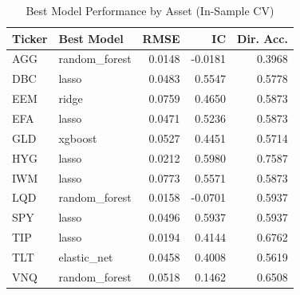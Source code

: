 \begin{table}
\caption{Best Model Performance by Asset (In-Sample CV)}
\label{tab:per_asset}
\begin{tabular}{llrrr}
\toprule
Ticker & Best Model & RMSE & IC & Dir. Acc. \\
\midrule
AGG & random_forest & 0.0148 & -0.0181 & 0.3968 \\
DBC & lasso & 0.0483 & 0.5547 & 0.5778 \\
EEM & ridge & 0.0759 & 0.4650 & 0.5873 \\
EFA & lasso & 0.0471 & 0.5236 & 0.5873 \\
GLD & xgboost & 0.0527 & 0.4451 & 0.5714 \\
HYG & lasso & 0.0212 & 0.5980 & 0.7587 \\
IWM & lasso & 0.0773 & 0.5571 & 0.5873 \\
LQD & random_forest & 0.0158 & -0.0701 & 0.5937 \\
SPY & lasso & 0.0496 & 0.5937 & 0.5937 \\
TIP & lasso & 0.0194 & 0.4144 & 0.6762 \\
TLT & elastic_net & 0.0458 & 0.4008 & 0.5619 \\
VNQ & random_forest & 0.0518 & 0.1462 & 0.6508 \\
\bottomrule
\end{tabular}
\end{table}
